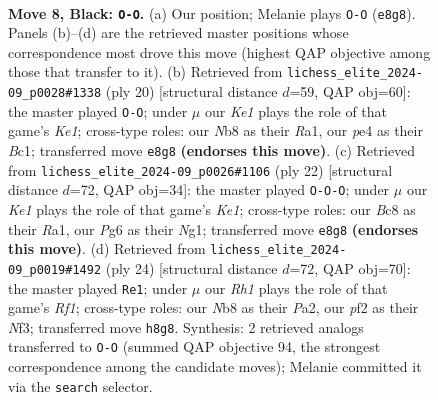 \documentclass[11pt]{article}
\begin{document}
\begin{figure}[p]\centering
\begin{subfigure}{0.46\textwidth}\centering
\resizebox{\linewidth}{!}{%
\newchessgame
\chessboard[
  setfen={rnbqk2r/ppp1pp1p/5bp1/8/2BPP3/2P4N/P4PPP/R1BQK2R b KQkq - 4 8},
  showmover=false,
  pgfstyle=straightmove, color=movearrow, markmove={e8-g8}
]}
\caption{}
\end{subfigure}\hfill
\begin{subfigure}{0.46\textwidth}\centering
\resizebox{\linewidth}{!}{%
\newchessgame
\chessboard[
  setfen={rnbqr1k1/p3bppp/2p2p2/1p6/3P4/3B1N1P/PPP1QPP1/R1B1K2R w KQ - 2 11},
  showmover=false,
  pgfstyle=straightmove, color=movearrow, markmove={e1-g1}
]}
\caption{}
\end{subfigure}
\\[4pt]
\begin{subfigure}{0.46\textwidth}\centering
\resizebox{\linewidth}{!}{%
\newchessgame
\chessboard[
  setfen={r1bqkb1r/ppp2ppp/4p3/3n4/2B3P1/3P1P2/PPPBQ2P/R3K1NR w KQkq - 0 12},
  showmover=false,
  pgfstyle=straightmove, color=movearrow, markmove={e1-c1}
]}
\caption{}
\end{subfigure}\hfill
\begin{subfigure}{0.46\textwidth}\centering
\resizebox{\linewidth}{!}{%
\newchessgame
\chessboard[
  setfen={rnbqr1k1/pp3pp1/2pb3p/8/3PB3/5N2/PPQ2PPP/R1B2RK1 w - - 0 13},
  showmover=false,
  pgfstyle=straightmove, color=movearrow, markmove={f1-e1}
]}
\caption{}
\end{subfigure}
\caption{\textbf{Move 8, Black: \texttt{O-O}.} (a) Our position; Melanie plays \texttt{O-O} (\texttt{e8g8}). Panels (b)--(d) are the retrieved master positions whose correspondence most drove this move (highest QAP objective among those that transfer to it). (b) Retrieved from \texttt{lichess\_elite\_2024-09\_p0028\#1338} (ply 20) [structural distance $d$=59, QAP obj=60]: the master played \texttt{O-O}; under $\mu$ our \emph{Ke1} plays the role of that game's \emph{Ke1}; cross-type roles: our \emph{N}b8 as their \emph{R}a1, our \emph{p}e4 as their \emph{B}c1; transferred move \texttt{e8g8} \textbf{(endorses this move)}. (c) Retrieved from \texttt{lichess\_elite\_2024-09\_p0026\#1106} (ply 22) [structural distance $d$=72, QAP obj=34]: the master played \texttt{O-O-O}; under $\mu$ our \emph{Ke1} plays the role of that game's \emph{Ke1}; cross-type roles: our \emph{B}c8 as their \emph{R}a1, our \emph{P}g6 as their \emph{N}g1; transferred move \texttt{e8g8} \textbf{(endorses this move)}. (d) Retrieved from \texttt{lichess\_elite\_2024-09\_p0019\#1492} (ply 24) [structural distance $d$=72, QAP obj=70]: the master played \texttt{Re1}; under $\mu$ our \emph{Rh1} plays the role of that game's \emph{Rf1}; cross-type roles: our \emph{N}b8 as their \emph{P}a2, our \emph{p}f2 as their \emph{N}f3; transferred move \texttt{h8g8}. Synthesis: 2 retrieved analogs transferred to \texttt{O-O} (summed QAP objective 94, the strongest correspondence among the candidate moves); Melanie committed it via the \texttt{search} selector.}
\label{fig:thought-m15}
\end{figure}
\end{document}
